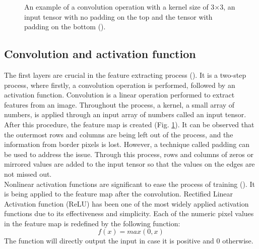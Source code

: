 \documentclass[english]{sbrt}
\begin{document}
\begin{figure}[hbt]
\centering 
{}
\caption{\label{fig:fig3} An example of a convolution operation with a kernel size of 3×3, an input tensor with no padding on the top and the tensor with padding on the bottom (\cite{yamashita_2018_convolutional}).}
\end{figure}

\subsection{Convolution and activation function}
The first layers are crucial in the feature extracting process (\cite{yamashita_2018_convolutional}). It is a two-step process, where firstly, a convolution operation is performed, followed by an activation function. Convolution is a linear operation performed to extract features from an image. Throughout the process, a kernel, a small array of numbers, is applied through an input array of numbers called an input tensor. After this procedure, the feature map is created (Fig. \ref{fig:fig3}). It can be observed that the outermost rows and columns are being left out of the process, and the information from border pixels is lost. However, a technique called padding can be used to address the issue. Through this process, rows and columns of zeros or mirrored values are added to the input tensor so that the values on the edges are not missed out. 
\\ Nonlinear activation functions are significant to ease the process of training (\cite{ramachandran_2017_searching}). It is being applied to the feature map after the convolution. Rectified Linear Activation function (ReLU) has been one of the most widely applied activation functions due to its effectiveness and simplicity. Each of the numeric pixel values in the feature map is redefined by the following function: \[ f(x) = max(0, x) \] The function will directly output the input in case it is positive and 0 otherwise. 
\end{document}
